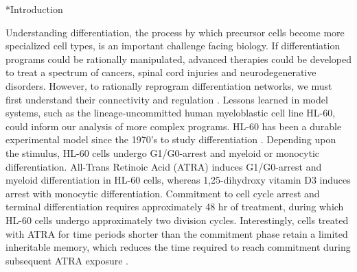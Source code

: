 \documentclass[12pt]{article}
\makeatletter
\renewcommand\section{\@startsection
	{subsection}{2}{0mm}
	{-0.2in}
	{0.05\baselineskip}
	{\normalfont\large\bfseries}}
\makeatother
\begin{document}
\pagebreak

\setcounter{page}{1}

\linenumbers

\section*{Introduction}

Understanding differentiation, 
the process by which precursor cells become more specialized cell types, 
is an important challenge facing biology. 
If differentiation programs could be rationally manipulated, 
advanced therapies could be developed to treat a spectrum of cancers, spinal cord injuries and neurodegenerative disorders. 
However, to rationally reprogram differentiation networks, 
we must first understand their connectivity and regulation \cite{Young2011}. 
Lessons learned in model systems, such as the lineage-uncommitted human myeloblastic cell line HL-60,
could inform our analysis of more complex programs. 
HL-60 has been a durable experimental model since the 1970's to study differentiation \cite{Breitman1980}.
Depending upon the stimulus, HL-60 cells undergo G1/G0-arrest and myeloid or monocytic differentiation. 
All-Trans Retinoic Acid (ATRA) induces G1/G0-arrest and myeloid differentiation in HL-60 cells, 
whereas 1,25-dihydroxy vitamin D3 induces arrest with monocytic differentiation.
Commitment to cell cycle arrest and terminal differentiation requires approximately 48 hr of treatment,
during which HL-60 cells undergo approximately two division cycles.  
Interestingly, cells treated with ATRA for time periods shorter than the commitment phase retain a limited inheritable memory, 
which reduces the time required to reach commitment during subsequent ATRA exposure \cite{YEN1984}.
\end{document}
